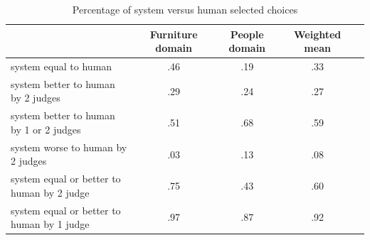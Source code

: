\begin{table}[h!]
\begin{center}
\begin{tabular}{|l|c|c|c|c|}
\hline
 & Furniture domain & People domain & Weighted mean \\
\hline
system equal to human  	&	.46	&	.19	&	.33 \\
system better to human by 2 judges &	.29 	& 	.24 	& 	.27 \\
system better to human by 1 or 2 judges & .51	&	.68	&	.59 \\
system worse to human by 2 judges &	.03	&	.13	&	.08 \\
system equal or better to human by 2 judge  &.75  &       .43	&       .60 \\
system equal or better to human by 1 judge  &.97	&	.87	&	.92 \\
\hline
\end{tabular}
\caption{Percentage of system versus human selected choices} 
\label{system-versus-human}
\end{center}
\end{table}




